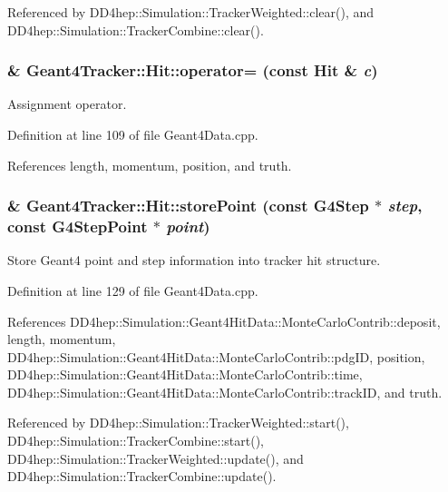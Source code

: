 Referenced by DD4hep::Simulation::TrackerWeighted::clear(), and DD4hep::Simulation::TrackerCombine::clear().\hypertarget{class_d_d4hep_1_1_simulation_1_1_geant4_tracker_1_1_hit_a97a85ebcb7994f55275d4479ca5c4a6a}{
\subsubsection[{operator=}]{ \& Geant4Tracker::Hit::operator= (const {\bf Hit} \& {\em c})}}
\label{class_d_d4hep_1_1_simulation_1_1_geant4_tracker_1_1_hit_a97a85ebcb7994f55275d4479ca5c4a6a}


Assignment operator. 

Definition at line 109 of file Geant4Data.cpp.

References length, momentum, position, and truth.\hypertarget{class_d_d4hep_1_1_simulation_1_1_geant4_tracker_1_1_hit_a8f2563ce396b2d2f7f6c6534aed3cdb4}{
\subsubsection[{storePoint}]{ \& Geant4Tracker::Hit::storePoint (const G4Step $\ast$ {\em step}, \/  const G4StepPoint $\ast$ {\em point})}}
\label{class_d_d4hep_1_1_simulation_1_1_geant4_tracker_1_1_hit_a8f2563ce396b2d2f7f6c6534aed3cdb4}


Store Geant4 point and step information into tracker hit structure. 

Definition at line 129 of file Geant4Data.cpp.

References DD4hep::Simulation::Geant4HitData::MonteCarloContrib::deposit, length, momentum, DD4hep::Simulation::Geant4HitData::MonteCarloContrib::pdgID, position, DD4hep::Simulation::Geant4HitData::MonteCarloContrib::time, DD4hep::Simulation::Geant4HitData::MonteCarloContrib::trackID, and truth.

Referenced by DD4hep::Simulation::TrackerWeighted::start(), DD4hep::Simulation::TrackerCombine::start(), DD4hep::Simulation::TrackerWeighted::update(), and DD4hep::Simulation::TrackerCombine::update().

